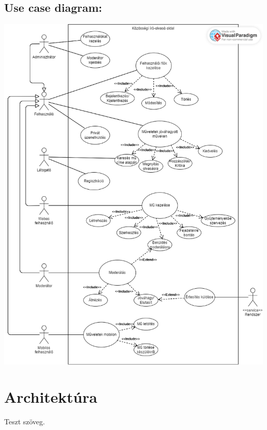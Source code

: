 \documentclass[12pt,a4paper,oneside]{article}
\begin{document}
\subsection{Use case diagram:}
\begin{center}
    \includegraphics[width=\textwidth,height=\textheight,keepaspectratio]{./figures/Use-case_diagram.png}
\end{center}


\section{Architektúra}
Teszt szöveg.\cite{wikipedia}

\newpage
\thispagestyle{empty}
{
    \footnotesize  %
    
    
}
\end{document}
